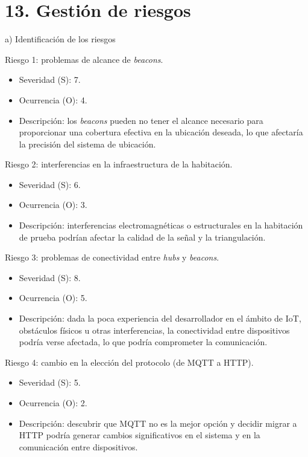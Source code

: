 \documentclass[
11pt, %
]{charter}
\begin{document}
\section{13. Gestión de riesgos}
\label{sec:riesgos}

a) Identificación de los riesgos
 
Riesgo 1: problemas de alcance de \textit{beacons}.
\begin{itemize}
	\item Severidad (S): 7.
	\item Ocurrencia (O): 4.
	\item Descripción: los \textit{beacons} pueden no tener el alcance necesario para proporcionar una cobertura efectiva en la ubicación deseada, lo que afectaría la precisión del sistema de ubicación.
\end{itemize}   

Riesgo 2: interferencias en la infraestructura de la habitación.
\begin{itemize}
	\item Severidad (S): 6.
	\item Ocurrencia (O): 3.
	\item Descripción: interferencias electromagnéticas o estructurales en la habitación de prueba podrían afectar la calidad de la señal y la triangulación.
\end{itemize}

Riesgo 3: problemas de conectividad entre \textit{hubs} y \textit{beacons}.
\begin{itemize}
	\item Severidad (S): 8.
	\item Ocurrencia (O): 5.
	\item Descripción: dada la poca experiencia del desarrollador en el ámbito de IoT, obstáculos físicos u otras interferencias, la conectividad entre dispositivos podría verse afectada, lo que podría comprometer la comunicación.
\end{itemize}

Riesgo 4: cambio en la elección del protocolo (de MQTT a HTTP).
\begin{itemize}
	\item Severidad (S): 5.
	\item Ocurrencia (O): 2.
	\item Descripción: descubrir que MQTT no es la mejor opción y decidir migrar a HTTP podría generar cambios significativos en el sistema y en la comunicación entre dispositivos.
\end{itemize}
\end{document}
